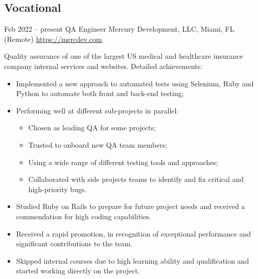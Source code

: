 \documentclass[11pt,a4paper,sans]{moderncv}
\begin{document}
\subsection{Vocational}
\cventry
{Feb 2022 -- present}
{QA Engineer}
{Mercury Development, LLC, Miami, FL (Remote)}
{\newline{}\url{https://mercdev.com}}{}
{Quality assurance of one of the largest US medical and healthcare insurance company internal services and websites. \newline{}
Detailed achievements:
\begin{itemize}
\item Implemented a new approach to automated tests using Selenium, Ruby and Python to automate both front and back-end testing;
\item Performing well at different sub-projects in parallel:
\begin{itemize}
\item Chosen as leading QA for some projects;
\item Trusted to onboard new QA team members;
\item Using a wide range of different testing tools and approaches;
\item Collaborated with side projects teams to identify and fix critical and high-priority bugs.
\end{itemize}
\item Studied Ruby on Rails to prepare for future project needs and received a commendation for high coding capabilities.
\item Received a rapid promotion, in recognition of exceptional performance and significant contributions to the team.
\item Skipped internal courses due to high learning ability and qualification and started working directly on the project.
\end{itemize}}

\end{document}
